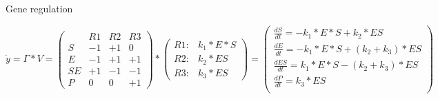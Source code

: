 \documentclass[11pt]{amsart}
\begin{document}
\

\clearpage

\

Gene regulation

\[{\dot  {y}} 
 = \Gamma *V 
 =  \begin{pmatrix}
 & R1 & R2 & R3\\
S &  -1 & +1 & 0\\
E &  -1 & +1 & +1\\
SE &  +1 & -1 & -1\\
P &  0 & 0 & +1
\end{pmatrix} * 
\begin{pmatrix}
R1: & k_1*E*S\\
R2: & k_2*ES\\
R3: & k_3*ES
\end{pmatrix} 
=\left(
{\begin{array}{c}
{\frac  {dS}{dt}=  -k_1*E*S + k_2*ES}\\[6pt]
{\frac  {dE}{dt} = -k_1*E*S + (k_2+k_3)*ES}\\[6pt]
{\frac  {dES}{dt} =  k_1*E*S - (k_2+k_3)*ES}\\[6pt]
{\frac  {dP}{dt} = k_3*ES}\\[6pt] 
\end{array}}
\right)\]
\end{document}
